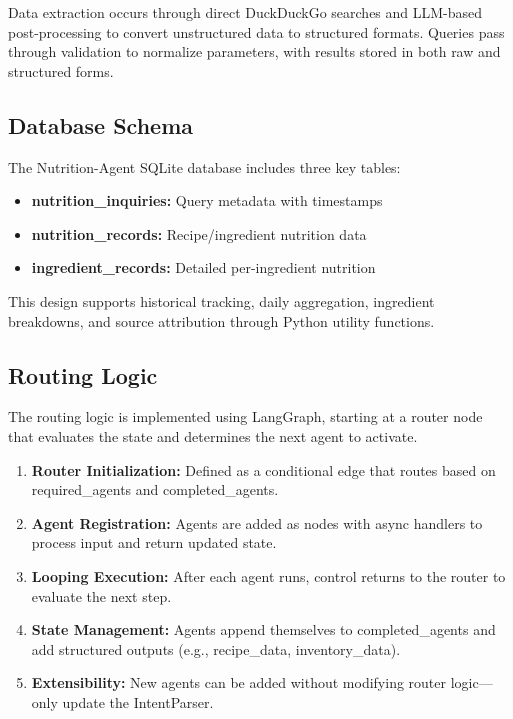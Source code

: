 \documentclass{ecai}
\begin{document}
Data extraction occurs through direct DuckDuckGo searches and LLM-based post-processing to convert unstructured data to structured formats. Queries pass through validation to normalize parameters, with results stored in both raw and structured forms.

\subsection{Database Schema}

The Nutrition-Agent SQLite database includes three key tables:
\begin{itemize}[noitemsep,topsep=0pt]
    \item \textbf{nutrition\_inquiries:} Query metadata with timestamps
    \item \textbf{nutrition\_records:} Recipe/ingredient nutrition data
    \item \textbf{ingredient\_records:} Detailed per-ingredient nutrition
\end{itemize}

This design supports historical tracking, daily aggregation, ingredient breakdowns, and source attribution through Python utility functions.

\subsection{Routing Logic}

The routing logic is implemented using LangGraph, starting at a router node that evaluates the state and determines the next agent to activate.
\begin{enumerate}[noitemsep,topsep=0pt]
    \item \textbf{Router Initialization:} Defined as a conditional edge that routes based on required\_agents and completed\_agents.
    \item \textbf{Agent Registration:} Agents are added as nodes with async handlers to process input and return updated state.
    \item \textbf{Looping Execution:} After each agent runs, control returns to the router to evaluate the next step.
    \item \textbf{State Management:} Agents append themselves to completed\_agents and add structured outputs (e.g., recipe\_data, inventory\_data).
    \item \textbf{Extensibility:} New agents can be added without modifying router logic—only update the IntentParser.
\end{enumerate}
\end{document}
